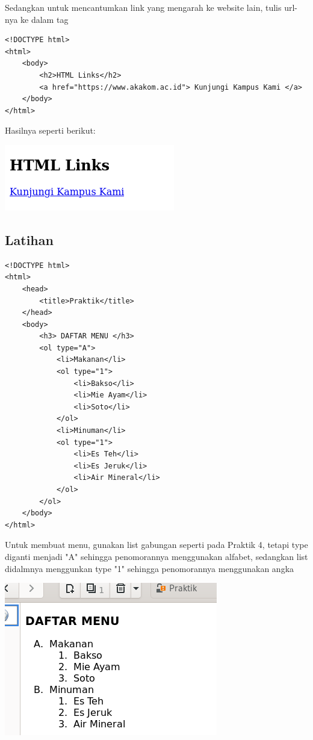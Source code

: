 \documentclass[a4paper,12pt]{article}
\begin{document}
Sedangkan untuk mencantumkan link yang mengarah ke website lain, tulis url-nya ke dalam tag
\begin{lstlisting}
<!DOCTYPE html>
<html>
    <body>
        <h2>HTML Links</h2>
        <a href="https://www.akakom.ac.id"> Kunjungi Kampus Kami </a>
    </body>
</html>
\end{lstlisting}
Hasilnya seperti berikut:
\begin{center}
    \includegraphics[width=\linewidth]{7.png}
\end{center}

\subsection{Latihan}
\begin{lstlisting}
<!DOCTYPE html>
<html>
    <head>
        <title>Praktik</title>
    </head>
    <body>
        <h3> DAFTAR MENU </h3>
        <ol type="A">
            <li>Makanan</li>
            <ol type="1">
                <li>Bakso</li>
                <li>Mie Ayam</li>
                <li>Soto</li>
            </ol>
            <li>Minuman</li>
            <ol type="1">
                <li>Es Teh</li>
                <li>Es Jeruk</li>
                <li>Air Mineral</li>
            </ol>
        </ol>
    </body>
</html>
\end{lstlisting}
Untuk membuat menu, gunakan list gabungan seperti pada Praktik 4, tetapi type diganti menjadi "A" sehingga penomorannya menggunakan alfabet, sedangkan list didalmnya menggunkan 
type "1" sehingga penomorannya menggunakan angka
\begin{center}
    \includegraphics[width=\linewidth]{8.png}
\end{center}
\end{document}
